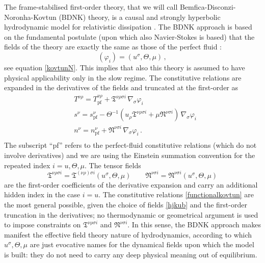 \documentclass[a4paper, amsfonts, amssymb, amsmath, reprint, twocolumn, showkeys, nofootinbib]{revtex4-2}
\begin{document}
The frame-stabilised first-order theory, that we will call Bemfica-Disconzi-Noronha-Kovtun (BDNK) theory, is a causal and strongly hyperbolic hydrodynamic model for relativistic dissipation  \citep{BemficaDNDefinitivo2020}. 
The BDNK approach is based on the fundamental postulate (upon which also Navier-Stokes is based) that the fields of the theory are exactly the same as those of the perfect fluid \citep{Kovtun2019}:
\begin{equation}\label{hjkub}
(\varphi_i) = (u^\sigma,\Theta,\mu) \, ,
\end{equation}
see equation \eqref{kovtunN}. This implies that also this theory is assumed to have physical applicability only in the slow regime. The constitutive relations are expanded in the derivatives of the fields and truncated at the first-order as
\begin{equation}\label{functionalkovtun}
\begin{split}
& T^{\nu \rho} = T^{\nu \rho}_{\text{pf}}+ \mathfrak{T}^{ \nu \rho \sigma i}  \, \nabla_\sigma \varphi_i \\
& s^\nu = s_{\text{pf}}^\nu - \Theta^{-1} (u_\rho \mathfrak{T}^{ \nu \rho  \sigma i} + \mu \mathfrak{N}^{ \nu  \sigma i}) \,  \nabla_\sigma \varphi_i \\
& n^\nu = n^\nu_{\text{pf}}+ \mathfrak{N}^{\nu  \sigma i}  \, \nabla_\sigma \varphi_i \,. \\
\end{split}
\end{equation}
The subscript ``pf'' refers to the perfect-fluid constitutive relations (which do not involve derivatives) and we are using the Einstein summation convention for the repeated index $i=u,\Theta,\mu$. The tensor fields
\begin{equation}
\mathfrak{T}^{ \nu \rho \sigma i}  = \mathfrak{T}^{ (\nu \rho) \sigma i}  (u^\sigma,\Theta,\mu)   \quad \quad \mathfrak{N}^{\nu  \sigma i} = \mathfrak{N}^{\nu  \sigma i} (u^\sigma,\Theta,\mu)
\end{equation}
are the first-order coefficients of the derivative expansion and carry an additional hidden index in the case $i = u$. 
The constitutive relations \eqref{functionalkovtun} are the most general possible, given the choice of fields \eqref{hjkub} and the first-order truncation in the derivatives; no thermodynamic or geometrical argument is used to impose constraints on $ \mathfrak{T}^{ \nu \rho \sigma i}$ and $\mathfrak{N}^{\nu  \sigma i} $. In this sense, the BDNK approach makes manifest the effective field theory nature of hydrodynamics, according to which $u^\sigma,\Theta,\mu$ are just evocative names for the dynamical fields upon which the model is built: they do not need to carry any deep physical meaning out of equilibrium.
\end{document}
